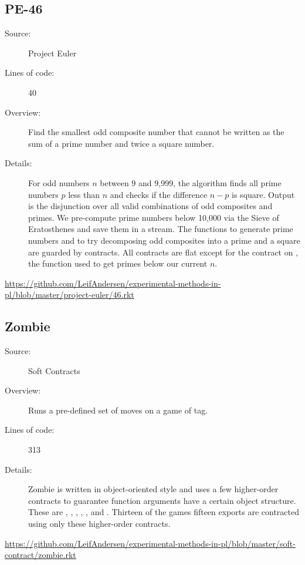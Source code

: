 \subsection*{PE-46~\hrulefill}
\begin{description}
\item[Source:] Project Euler
\item[Lines of code:] 40
\item[Overview:]
  Find the smallest odd composite number that cannot be written as the sum of a prime number and twice a square number.
\item[Details:] 
  For odd numbers $n$ between 9 and 9,999, the algorithm finds all prime numbers $p$ less than $n$ and checks if the difference $n - p$ is square.
  Output is the  disjunction over all valid combinations of odd composites and primes.
  We pre-compute prime numbers below 10,000 via the Sieve of Eratosthenes and save them in a stream.
  The functions to generate prime numbers and to try decomposing odd composites into a prime and a square are guarded by contracts.
  All contracts are flat except for the contract on , the function used to get primes below our current $n$.
\end{description}
\url{https://github.com/LeifAndersen/experimental-methods-in-pl/blob/master/project-euler/46.rkt}

\subsection*{Zombie~\hrulefill}
\begin{description}
\item[Source:] Soft Contracts
\item[Overview:]
  Runs a pre-defined set of moves on a game of tag.
\item[Lines of code:] 313
\item[Details:]
  Zombie is written in object-oriented style and uses a few higher-order contracts to guarantee function arguments have a certain object structure.
  These are , , , , , and .
  Thirteen of the games fifteen exports are contracted using only these higher-order contracts.
\end{description}
\url{https://github.com/LeifAndersen/experimental-methods-in-pl/blob/master/soft-contract/zombie.rkt}

